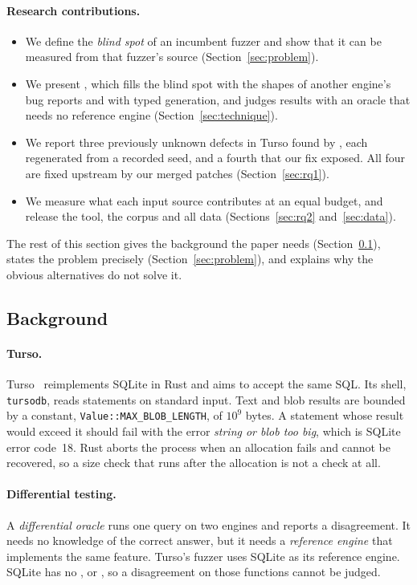 \paragraph{Research contributions.}
\begin{itemize}
  \item We define the \emph{blind spot} of an incumbent fuzzer and show that it
        can be measured from that fuzzer's source (Section~\ref{sec:problem}).
  \item We present \tool, which fills the blind spot with the shapes of another
        engine's bug reports and with typed generation, and judges results with an
        oracle that needs no reference engine (Section~\ref{sec:technique}).
  \item We report three previously unknown defects in Turso found by \tool, each
        regenerated from a recorded seed, and a fourth that our fix exposed. All
        four are fixed upstream by our merged patches (Section~\ref{sec:rq1}).
  \item We measure what each input source contributes at an equal budget, and
        release the tool, the corpus and all data
        (Sections~\ref{sec:rq2} and~\ref{sec:data}).
\end{itemize}

The rest of this section gives the background the paper needs
(Section~\ref{sec:background}), states the problem precisely
(Section~\ref{sec:problem}), and explains why the obvious alternatives do not
solve it.

\subsection{Background}
\label{sec:background}

\paragraph{Turso.} Turso~\cite{turso} reimplements SQLite in Rust and aims to
accept the same SQL. Its shell, \texttt{tursodb}, reads statements on standard
input. Text and blob results are bounded by a constant,
\texttt{Value::MAX\_BLOB\_LENGTH}, of $10^9$ bytes. A statement whose result
would exceed it should fail with the error \emph{string or blob too big}, which
is SQLite error code~18. Rust aborts the process when an allocation fails and cannot be
recovered, so a size check that runs after the allocation is not a check at all.

\paragraph{Differential testing.} A \emph{differential oracle} runs one query on
two engines and reports a disagreement. It needs no knowledge of the correct
answer, but it needs a \emph{reference engine} that implements the same feature.
Turso's fuzzer uses SQLite as its reference engine. SQLite has no ,
 or , so a disagreement on those functions cannot be
judged.

